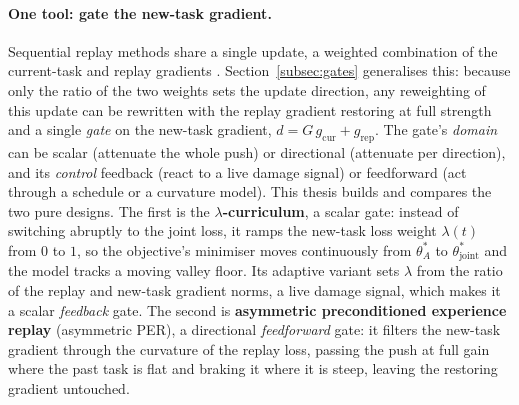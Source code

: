 \paragraph{One tool: gate the new-task gradient.}
Sequential replay methods share a single update, a weighted combination of the current-task and replay gradients \citep{sodhani2022introductionlifelongsupervisedlearning}. Section~\ref{subsec:gates} generalises this: because only the ratio of the two weights sets the update direction, any reweighting of this update can be rewritten with the replay gradient restoring at full strength and a single \emph{gate} on the new-task gradient, $d = G\, g_{\text{cur}} + g_{\text{rep}}$. The gate's \emph{domain} can be scalar (attenuate the whole push) or directional (attenuate per direction), and its \emph{control} feedback (react to a live damage signal) or feedforward (act through a schedule or a curvature model). This thesis builds and compares the two pure designs. The first is the \textbf{$\lambda$-curriculum}, a scalar gate: instead of switching abruptly to the joint loss, it ramps the new-task loss weight $\lambda(t)$ from $0$ to $1$, so the objective's minimiser moves continuously from $\theta_A^*$ to $\theta_{\text{joint}}^*$ and the model tracks a moving valley floor. Its adaptive variant sets $\lambda$ from the ratio of the replay and new-task gradient norms, a live damage signal, which makes it a scalar \emph{feedback} gate. The second is \textbf{asymmetric preconditioned experience replay} (asymmetric PER), a directional \emph{feedforward} gate: it filters the new-task gradient through the curvature of the replay loss, passing the push at full gain where the past task is flat and braking it where it is steep, leaving the restoring gradient untouched.
